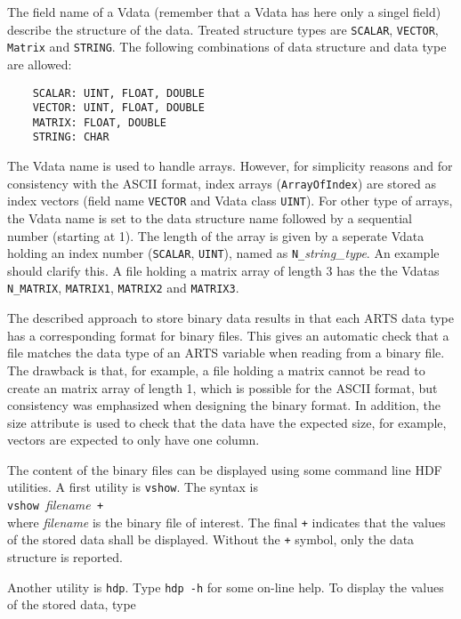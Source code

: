  The field name of a Vdata (remember that a Vdata has here only a
 singel field) describe the structure of the data. Treated structure
 types are \verb|SCALAR|, \verb|VECTOR|, \verb|Matrix| and \verb|STRING|.
 The following combinations of data structure and data type are allowed:
 \begin{verbatim}
    SCALAR: UINT, FLOAT, DOUBLE 
    VECTOR: UINT, FLOAT, DOUBLE 
    MATRIX: FLOAT, DOUBLE 
    STRING: CHAR
 \end{verbatim} 
 The Vdata name is used to handle arrays. However, for simplicity
 reasons and for consistency with the ASCII format, index arrays
 (\verb|ArrayOfIndex|) are stored as index vectors (field name
 \verb|VECTOR| and Vdata class \verb|UINT|). For other type of
 arrays, the Vdata name is set to the data structure name followed
 by a sequential number (starting at 1). The length of the array
 is given by a seperate Vdata holding an index number (\verb|SCALAR|,
 \verb|UINT|), named as \verb|N_|{\it string\_type}. An example should
 clarify this. A file holding a matrix array of length 3 has the
 the Vdatas \verb|N_MATRIX|, \verb|MATRIX1|, \verb|MATRIX2| and
 \verb|MATRIX3|.

 The described approach to store binary data results in that each
 ARTS data type has a corresponding format for binary files. This 
 gives an automatic check that a file matches the data type of
 an ARTS variable when reading from a binary file. The drawback
 is that, for example, a file holding a matrix cannot be read to create
 an matrix array of length 1, which is possible for the ASCII format,
 but consistency was emphasized when designing the binary format.
 In addition, the size attribute is used to check that the data
 have the expected size, for example, vectors are expected to only
 have one column.
 

 \label{sec:formats:file:binary:display}

 The content of the binary files can be displayed using some command
 line HDF utilities. A first utility is
 \verb|vshow|. The syntax is \\

 \verb|vshow |{\it filename}\verb| +| \\

 \noindent
 where {\it filename} is the binary file of interest. The final \verb|+|
 indicates that the values of the stored data shall be displayed. Without
 the \verb|+| symbol, only the data structure is reported.

 Another utility is \verb|hdp|. Type \verb|hdp -h| for some on-line help.
 To display the values of the stored data, type\\
 
